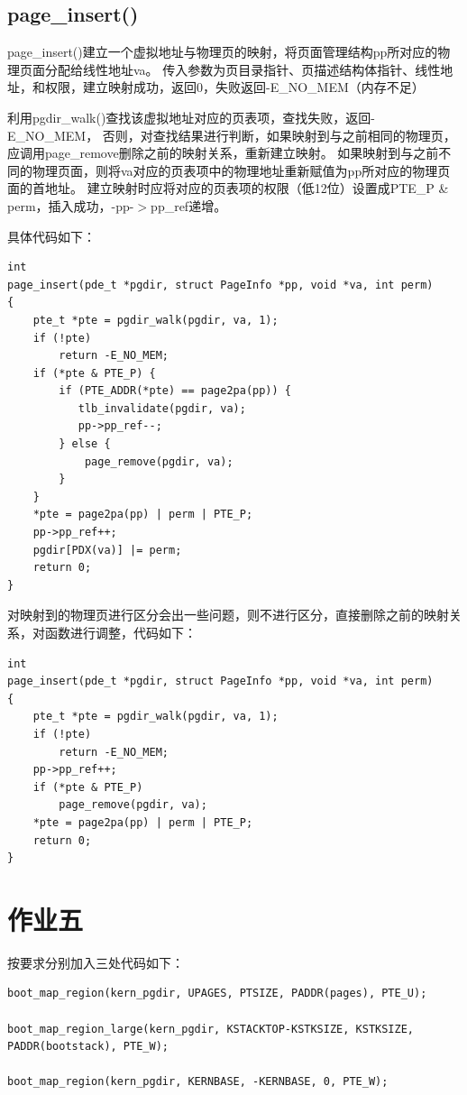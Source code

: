 \documentclass[12pt,a4paper,UTF8]{article}
\begin{document}
    \subsection{page\_insert()}

    page\_insert()建立一个虚拟地址与物理页的映射，将页面管理结构pp所对应的物理页面分配给线性地址va。
    传入参数为页目录指针、页描述结构体指针、线性地址，和权限，建立映射成功，返回0，失败返回-E\_NO\_MEM（内存不足）

    利用pgdir\_walk()查找该虚拟地址对应的页表项，查找失败，返回-E\_NO\_MEM，
    否则，对查找结果进行判断，如果映射到与之前相同的物理页，应调用page\_remove删除之前的映射关系，重新建立映射。
    如果映射到与之前不同的物理页面，则将va对应的页表项中的物理地址重新赋值为pp所对应的物理页面的首地址。
    建立映射时应将对应的页表项的权限（低12位）设置成PTE\_P \& perm，插入成功，-pp-$>$pp\_ref递增。

    具体代码如下：

    \begin{lstlisting}[style=CPP]
int
page_insert(pde_t *pgdir, struct PageInfo *pp, void *va, int perm)
{
	pte_t *pte = pgdir_walk(pgdir, va, 1);
    if (!pte)
        return -E_NO_MEM;
   	if (*pte & PTE_P) {
        if (PTE_ADDR(*pte) == page2pa(pp)) {
           tlb_invalidate(pgdir, va);
           pp->pp_ref--;
        } else {
	        page_remove(pgdir, va);
  	    }
  	}
	*pte = page2pa(pp) | perm | PTE_P;
 	pp->pp_ref++;
  	pgdir[PDX(va)] |= perm;
	return 0;
}
    \end{lstlisting}

    对映射到的物理页进行区分会出一些问题，则不进行区分，直接删除之前的映射关系，对函数进行调整，代码如下：

    \begin{lstlisting}[style=CPP]
int 
page_insert(pde_t *pgdir, struct PageInfo *pp, void *va, int perm)
{
    pte_t *pte = pgdir_walk(pgdir, va, 1);
    if (!pte)
        return -E_NO_MEM;
    pp->pp_ref++;
    if (*pte & PTE_P)
        page_remove(pgdir, va);
    *pte = page2pa(pp) | perm | PTE_P;
    return 0;
}
    \end{lstlisting}


\section{作业五}

    按要求分别加入三处代码如下：
    \begin{lstlisting}[style=CPP]
boot_map_region(kern_pgdir, UPAGES, PTSIZE, PADDR(pages), PTE_U);

boot_map_region_large(kern_pgdir, KSTACKTOP-KSTKSIZE, KSTKSIZE, PADDR(bootstack), PTE_W);

boot_map_region(kern_pgdir, KERNBASE, -KERNBASE, 0, PTE_W);
    \end{lstlisting}
\end{document}
